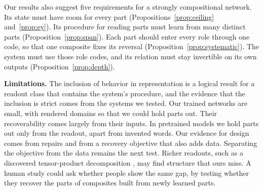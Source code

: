 Our results also suggest five requirements for a strongly compositional network. Its state must have room for every part (Propositions~\ref{prop:ceiling} and~\ref{prop:ey}). Its procedure for reading parts must learn from many distinct parts (Proposition~\ref{prop:span}). Each part should enter every role through one code, so that one composite fixes its reversal (Proposition~\ref{prop:systematic}). The system must use those role codes, and its relation must stay invertible on its own outputs (Proposition~\ref{prop:depth}).

\textbf{Limitations.} The inclusion of behavior in representation is a logical result for a readout class that contains the system's procedure, and the evidence that the inclusion is strict comes from the systems we tested. Our trained networks are small, with rendered domains so that we could hold parts out. Their recoverability comes largely from their inputs. In pretrained models we hold parts out only from the readout, apart from invented words. Our evidence for design comes from repairs and from a recovery objective that also adds data. Separating the objective from the data remains the next test. Richer readouts, such as a discovered tensor-product decomposition \citep{mccoy2019}, may find structure that ours miss. A human study could ask whether people show the same gap, by testing whether they recover the parts of composites built from newly learned parts.

